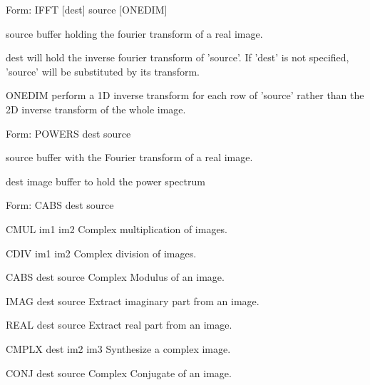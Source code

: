 {\newpage\clearpage
{}%
\begin{command}
  \item[Form: IFFT  {[dest]} source {[ONEDIM]}\hfill]{}
  \item[source]{buffer holding the fourier transform of a real image.}
  \item[dest]{will hold the inverse fourier transform of 'source'. If
       'dest' is not specified, 'source' will be substituted by its
       transform.}
  \item[ONEDIM]{perform a 1D inverse transform for each row of 'source'
       rather than the 2D inverse transform of the whole image.}
\end{command}%
\lthtmlfigureZ
\lthtmlcheckvsize\clearpage}

{\newpage\clearpage
{}%
\begin{command}
  \item[Form: POWERS dest source\hfill]{}
  \item[source]{buffer with the Fourier transform of a real image.}
  \item[dest]{image buffer to hold the power spectrum}
\end{command}%
\lthtmlfigureZ
\lthtmlcheckvsize\clearpage}

{\newpage\clearpage
{}%
\begin{command}
  \item[Form: CABS dest source\hfill]{}
\end{command}%
\lthtmlfigureZ
\lthtmlcheckvsize\clearpage}

{\newpage\clearpage
{}%
\begin{command}
  \item[CMUL im1 im2\hfill]{Complex multiplication of images.}
  \item[CDIV im1 im2\hfill]{Complex division of images.}
  \item[CABS dest source   \hfill]{Complex Modulus of an image.}
  \item[IMAG dest source   \hfill]{Extract imaginary part from an image.}
  \item[REAL dest source   \hfill]{Extract real part from an image.}
  \item[CMPLX dest im2 im3 \hfill]{Synthesize a complex image}.
  \item[CONJ dest source   \hfill]{Complex Conjugate of an image.}
\end{command}%
\lthtmlfigureZ
\lthtmlcheckvsize\clearpage}

